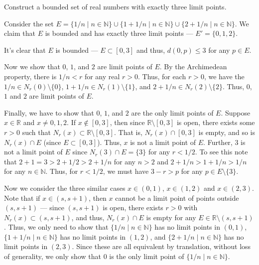 \documentclass[12 pt, letterpaper]{hmcpset}
\begin{document}
\begin{problem}
	Construct a bounded set of real numbers with exactly three limit points.
\end{problem}

\begin{solution}
	Consider the set $E = \{ 1/n \mid n \in \mathbb{N} \} \cup \{ 1 + 1/n \mid n \in \mathbb{N} \} \cup \{ 2 + 1/n \mid n \in \mathbb{N} \}$. We claim that $E$ is bounded and has exactly three limit points --- $E' = \{ 0, 1, 2 \}$.

	It's clear that $E$ is bounded --- $E \subset [0, 3]$ and thus, $d(0, p) \le 3$ for any $p \in E$.

	Now we show that $0$, $1$, and $2$ are limit points of $E$. By the Archimedean property, there is $1/n < r$ for any real $r > 0$. Thus, for each $r > 0$, we have the $1/n \in N_{r}(0) \setminus \{ 0 \}$, $1 + 1/n \in N_{r}(1) \setminus \{ 1 \}$, and $2 + 1/n \in N_{r}(2) \setminus \{ 2 \}$. Thus, $0$, $1$ and $2$ are limit points of $E$.

	Finally, we have to show that $0$, $1$, and $2$ are the only limit points of $E$. Suppose $x \in \mathbb{R}$ and $x \neq 0, 1, 2$. If $x \notin [0, 3]$, then since $\mathbb{R} \setminus [0, 3]$ is open, there exists some $r > 0$ such that $N_{r}(x) \subset \mathbb{R} \setminus [0, 3]$. That is, $N_{r}(x) \cap [0, 3]$ is empty, and so is $N_{r}(x) \cap E$ (since $E \subset [0, 3]$). Thus, $x$ is not a limit point of $E$. Further, $3$ is not a limit point of $E$ since $N_{r}(3) \cap E = \{ 3 \}$ for any $r < 1/2$. To see this note that $2 + 1 = 3 > 2 + 1/2 > 2 + 1/n$ for any $n > 2$ and $2 + 1/n > 1 + 1/n > 1/n$ for any $n \in \mathbb{N}$. Thus, for $r < 1/2$, we must have $3 - r > p$ for any $p \in E \setminus \{ 3 \}$.

	Now we consider the three similar cases $x \in (0, 1)$, $x \in (1, 2)$ and $x \in (2, 3)$. Note that if $x \in (s, s + 1)$, then $x$ cannot be a limit point of points outside $(s, s + 1)$ --- since $(s, s + 1)$ is open, there exists  $r > 0$ with $N_{r}(x) \subset (s, s + 1)$, and thus, $N_{r}(x) \cap E$ is empty for any $E \in \mathbb{R} \setminus (s, s + 1)$. Thus, we only need to show that $\{ 1/n \mid n \in \mathbb{N} \}$ has no limit points in $(0, 1)$, $\{ 1 + 1/n \mid n \in \mathbb{N} \}$ has no limit points in $(1, 2)$, and $\{ 2 + 1/n \mid n \in \mathbb{N} \}$ has no limit points in $(2, 3)$. Since these are all equivalent by translation, without loss of generality, we only show that $0$ is the only limit point of $\{ 1/n \mid n \in \mathbb{N} \}$.


\end{solution}
\end{document}
